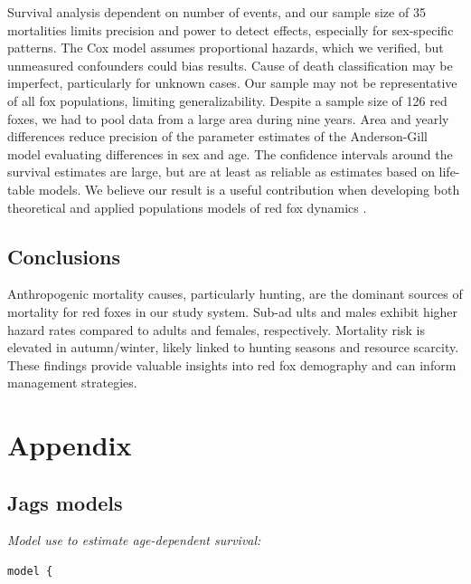\documentclass[12pt,a4paper,final,abstract=true,headings=small]{scrartcl}
\begin{document}
Survival analysis dependent on number of events, and our sample size of 35 mortalities limits precision and power to detect effects, especially for sex-specific patterns. The Cox model assumes proportional hazards, which we verified, but unmeasured confounders could bias results. Cause of death classification may be imperfect, particularly for unknown cases. Our sample may not be representative of all fox populations, limiting generalizability. Despite a sample size of 126 red foxes, we had to pool data from a large area during nine years. Area and yearly differences reduce precision of the parameter estimates of the Anderson-Gill model evaluating differences in sex and age. The confidence intervals around the survival estimates are large, but are at least as reliable as estimates based on life-table models. We believe our result is a useful contribution when developing both theoretical and applied populations models of red fox dynamics \citep{devenish-nelsonDemographyCarnivoreRed2013,schaubIntegratedPopulationModels2021b}.

\subsection*{Conclusions}

Anthropogenic mortality causes, particularly hunting, are the dominant sources of mortality for red foxes in our study system. Sub-ad  ults and males exhibit higher hazard rates compared to adults and females, respectively. Mortality risk is elevated in autumn/winter, likely linked to hunting seasons and resource scarcity. These findings provide valuable insights into red fox demography and can inform management strategies.

\newpage
\singlespacing

\printbibliography

\newpage

\section*{Appendix}

\subsection*{Jags models}

\emph{Model use to estimate age-dependent survival:} \label{app:brood}

\begin{lstlisting}[language=JAGS]
model {

\end{lstlisting}
\end{document}
